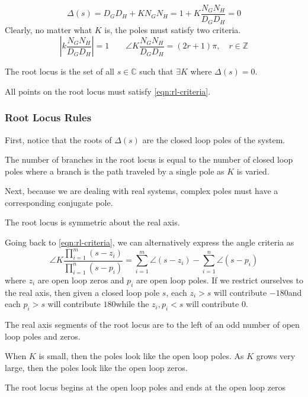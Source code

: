 \begin{equation}
  \Delta(s) = D_GD_H+KN_GN_H = 1 + K\frac{N_GN_H}{D_GD_H} = 0
  \label{eqn:rl-character-poly}
\end{equation}
Clearly, no matter what $K$ is, the poles must satisfy two criteria.
\begin{equation}
  \left|k\frac{N_GN_H}{D_GD_H}\right| = 1 \qquad \angle K\frac{N_GN_H}{D_GD_H} = (2r+1)\pi,\quad r\in\mathbb{Z}
  \label{eqn:rl-criteria}
\end{equation}
\begin{definition}
  The root locus is the set of all $s\in\mathbb{C}$ such that $\exists K$ where $\Delta(s) = 0$.
  \label{defn:root-locus}
\end{definition}
All points on the root locus must satisfy \cref{eqn:rl-criteria}.
\subsubsection{Root Locus Rules}
First, notice that the roots of $\Delta(s)$ are the closed loop poles of the system. 
\begin{theorem}
  The number of branches in the root locus is equal to the number of closed loop poles where a branch is the path traveled by a single pole as $K$ is varied.
  \label{thm:rl-one}
\end{theorem}
Next, because we are dealing with real systems, complex poles must have a corresponding conjugate pole.
\begin{theorem}
  The root locus is symmetric about the real axis.
  \label{thm:rl-two}
\end{theorem}
Going back to \cref{eqn:rl-criteria}, we can alternatively express the angle criteria as
\[
  \angle K \frac{\prod_{i=1}^m (s-z_i)}{\prod_{i=1}^n (s-p_i)} = \sum_{i=1}^m \angle (s-z_i) - \sum_{i=1}^n \angle (s-p_i)
\]
where $z_i$ are open loop zeros and $p_i$ are open loop poles.
If we restrict ourselves to the real axis, then given a closed loop pole $s$, each $z_i > s$ will contribute $-180$\textdegree and each $p_i > s$ will contribute $180$\textdegree while the $z_i, p_i < s$ will contribute $0$\textdegree.
\begin{theorem}
  The real axis segments of the root locus are to the left of an odd number of open loop poles and zeros.
  \label{thm:rl-three}
\end{theorem}
When $K$ is small, then the poles look like the open loop poles. As $K$ grows very large, then the poles look like the open loop zeros.
\begin{theorem}
  The root locus begins at the open loop poles and ends at the open loop zeros
  \label{thm:rl-four}
\end{theorem}
